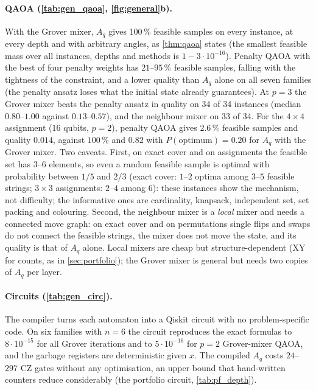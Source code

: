 \paragraph{QAOA (\cref{tab:gen_qaoa}, \cref{fig:general}b).} With the Grover mixer, $A_q$ gives 100\,\% feasible samples on every instance, at every depth and with arbitrary angles, as \cref{thm:qaoa} states (the smallest feasible mass over all instances, depths and methods is $1-3\cdot10^{-16}$). Penalty QAOA with the best of four penalty weights has $21$--$95$\,\% feasible samples, falling with the tightness of the constraint, and a lower quality than $A_q$ alone on all seven families (the penalty ansatz loses what the initial state already guarantees). At $p=3$ the Grover mixer beats the penalty ansatz in quality on 34 of 34 instances (median $0.80$--$1.00$ against $0.13$--$0.57$), and the neighbour mixer on 33 of 34. For the $4\times4$ assignment ($16$ qubits, $p=2$), penalty QAOA gives $2.6$\,\% feasible samples and quality $0.014$, against $100$\,\% and $0.82$ with $P(\mathrm{optimum})=0.20$ for $A_q$ with the Grover mixer. Two caveats. First, on exact cover and on assignments the feasible set has $3$--$6$ elements, so even a random feasible sample is optimal with probability between $1/5$ and $2/3$ (exact cover: $1$--$2$ optima among $3$--$5$ feasible strings; $3\times3$ assignments: $2$--$4$ among $6$): these instances show the mechanism, not difficulty; the informative ones are cardinality, knapsack, independent set, set packing and colouring. Second, the neighbour mixer is a \emph{local} mixer and needs a connected move graph: on exact cover and on permutations single flips and swaps do not connect the feasible strings, the mixer does not move the state, and its quality is that of $A_q$ alone. Local mixers are cheap but structure-dependent (XY for counts, as in \cref{sec:portfolio}); the Grover mixer is general but needs two copies of $A_q$ per layer.

\paragraph{Circuits (\cref{tab:gen_circ}).} The compiler turns each automaton into a Qiskit circuit with no problem-specific code. On six families with $n=6$ the circuit reproduces the exact formulas to $8\cdot10^{-15}$ for all Grover iterations and to $5\cdot10^{-16}$ for $p=2$ Grover-mixer QAOA, and the garbage registers are deterministic given $x$. The compiled $A_q$ costs $24$--$297$ CZ gates without any optimisation, an upper bound that hand-written counters reduce considerably (the portfolio circuit, \cref{tab:pf_depth}).

